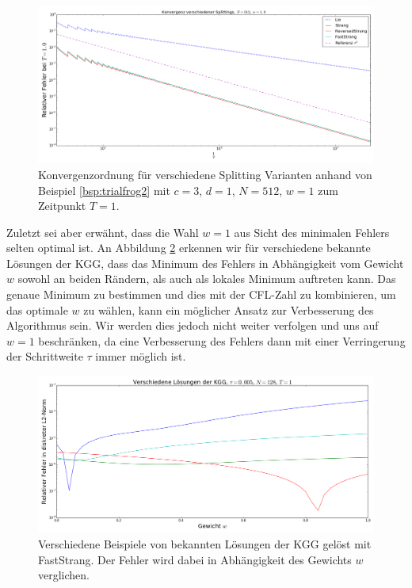 \begin{mathbsp}
\begin{figure}[!htb]
\includegraphics[width=\textwidth]{Figures/splitting_convergence_fix_weight_frog2_cfl_corrected.png}
\caption{Konvergenzordnung für verschiedene Splitting Varianten anhand von Beispiel \ref{bsp:trialfrog2} mit $c=3$, $d=1$, $N=512$, $w=1$ zum Zeitpunkt $T=1$.}
\label{fig:splitting_convergence_w1}
\end{figure}
Zuletzt sei aber erwähnt, dass die Wahl $w=1$ aus Sicht des minimalen Fehlers selten optimal ist. An Abbildung \ref{fig:splitting_dependence_on_weight} erkennen wir für verschiedene bekannte Lösungen der KGG, dass das Minimum des Fehlers in Abhängigkeit vom Gewicht $w$ sowohl an beiden Rändern, als auch als lokales Minimum auftreten kann. Das genaue Minimum zu bestimmen und dies mit der CFL-Zahl zu kombinieren, um das optimale $w$ zu wählen, kann ein möglicher Ansatz zur Verbesserung des Algorithmus sein. Wir werden dies jedoch nicht weiter verfolgen und uns auf $w=1$ beschränken, da eine Verbesserung des Fehlers dann mit einer Verringerung der Schrittweite $\tau$ immer möglich ist.
\begin{figure}[!htb]
\includegraphics[width=\textwidth]{Figures/splitting_error_over_weights.png}
\caption{Verschiedene Beispiele von bekannten Lösungen der KGG gelöst mit FastStrang. Der Fehler wird dabei in Abhängigkeit des Gewichts $w$ verglichen.}
\label{fig:splitting_dependence_on_weight}
\end{figure}
\end{mathbsp}
